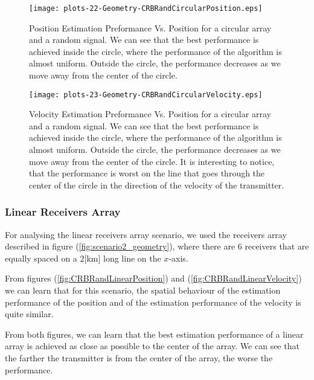 \begin{figure}
\begin{center}
\texttt{[image: plots-22-Geometry-CRBRandCircularPosition.eps]} 
\end{center}
\caption[Position Estimation Preformance Vs. Position for a circular array and a random signal]
{Position Estimation Preformance Vs. Position for a circular array and a random signal. We can see that the best performance is achieved inside the circle, where the performance of the algorithm is almost uniform. Outside the circle, the performance decreases as we move away from the center of the circle.}
\label{fig:CRBRandCircularPosition}
\end{figure}

\begin{figure}
\begin{center}
\texttt{[image: plots-23-Geometry-CRBRandCircularVelocity.eps]} 
\end{center}
\caption[Velocity Estimation Preformance Vs. Position for a circular array and a random signal]
{Velocity Estimation Preformance Vs. Position for a circular array and a random signal. We can see that the best performance is achieved inside the circle, where the performance of the algorithm is almost uniform. Outside the circle, the performance decreases as we move away from the center of the circle. It is interesting to notice, that the performance is worst on the line that goes through the center of the circle in the direction of the velocity of the transmitter.}
\label{fig:CRBRandCircularVelocity}
\end{figure}

\subsubsection*{Linear Receivers Array}
For analysing the linear receivers array scenario, we used the receivers array described in figure (\ref{fig:scenario2_geometry}), where there are 6 receivers that are equally spaced on a $2$[km] long line on the $x$-axis.

From figures (\ref{fig:CRBRandLinearPosition}) and (\ref{fig:CRBRandLinearVelocity}) we can learn that for this scenario, the spatial behaviour of the estimation performance of the position and of the estimation performance of the velocity is quite similar.

From both figures, we can learn that the best estimation performance of a linear array is achieved as close as possible to the center of the array. We can see that the farther the transmitter is from the center of the array, the worse the performance.

